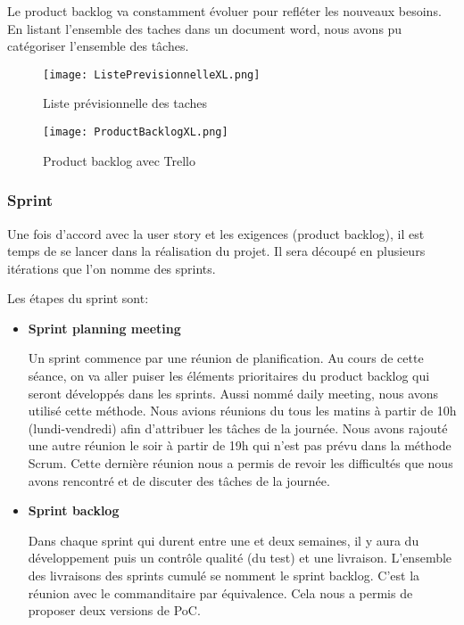 Le product backlog va constamment évoluer pour refléter les nouveaux besoins. 
En listant l'ensemble des taches dans un document word, nous avons pu catégoriser l’ensemble des tâches.

\begin{figure}[h!]
  \centering
  \texttt{[image: ListePrevisionnelleXL.png]}
	\caption[]{Liste prévisionnelle des taches}
	\label{}
\end{figure}

\begin{figure}[h!]
  \centering
  \texttt{[image: ProductBacklogXL.png]}
	\caption[]{Product backlog avec Trello}
	\label{}
\end{figure}



\subsubsection{Sprint}
Une fois d'accord avec la user story et les exigences (product backlog), il est temps de se lancer dans la réalisation du projet.
Il sera découpé en plusieurs itérations que l'on nomme des sprints. 

Les étapes du sprint sont:
\begin{itemize}
    \item \textbf{Sprint planning meeting}

    Un sprint commence par une réunion de planification.
    Au cours de cette séance, on va aller puiser les éléments prioritaires du product backlog qui seront développés dans les sprints.
    Aussi nommé daily meeting, nous avons utilisé cette méthode.
    Nous avions réunions du tous les matins à partir de 10h (lundi-vendredi) afin d'attribuer les tâches de la journée.
    Nous avons rajouté une autre réunion le soir à partir de 19h qui n’est pas prévu dans la méthode Scrum.
    Cette dernière réunion nous a permis de revoir les difficultés que nous avons rencontré et de discuter des tâches de la journée. 
    \item \textbf{Sprint backlog}

    Dans chaque sprint qui durent entre une et deux semaines, il y aura du développement puis un contrôle qualité (du test) et une livraison.
    L'ensemble des livraisons des sprints cumulé se nomment le sprint backlog.
    C'est la réunion avec le commanditaire par équivalence.
    Cela nous a permis de proposer deux versions de PoC.   
\end{itemize}



